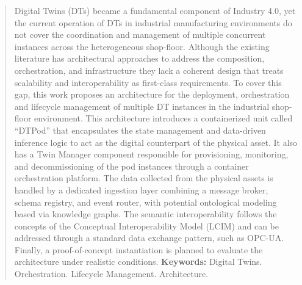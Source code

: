 \begin{abstract}
  Digital Twins (DTs) became a fundamental component of Industry 4.0, yet the current operation of DTs in industrial manufacturing 
  environments do not cover the coordination and management of multiple concurrent instances across the heterogeneous shop-floor. 
  Although the existing literature has architectural approaches to address the composition, orchestration, and infrastructure they 
  lack a coherent design that treats scalability and interoperability as first-class requirements. To cover this gap, this work 
  proposes an architecture for the deployment, orchestration and lifecycle management of multiple DT instances in the industrial 
  shop-floor environment. This architecture introduces a containerized unit called ``DTPod'' that encapsulates the state management 
  and data-driven inference logic to act as the digital counterpart of the physical asset. It also has a Twin Manager component 
  responsible for provisioning, monitoring, and decommissioning of the pod instances through a container orchestration platform. 
  The data collected from the physical assets is handled by a dedicated ingestion layer combining a message broker, schema registry, 
  and event router, with potential ontological modeling based via knowledge graphs. The semantic interoperability follows the concepts 
  of the Conceptual Interoperability Model (LCIM) and can be addressed through a standard data exchange pattern, such as OPC-UA. 
  Finally, a proof-of-concept instantiation is planned to evaluate the architecture under realistic conditions.
  \vspace{\baselineskip}\newline
  \textbf{Keywords:} Digital Twins. Orchestration. Lifecycle Management. Architecture.
\end{abstract}

\listoffigures*  %
\listoftables*

\listadesiglas[5em]

